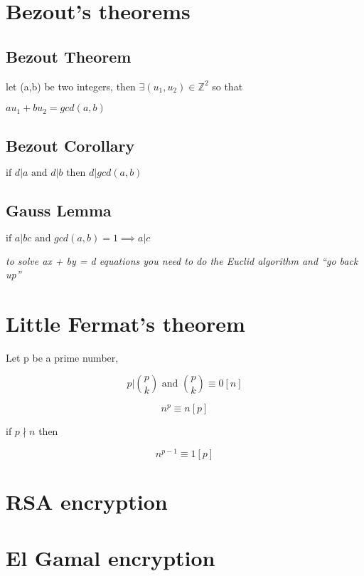 \documentclass[notitlepage]{math}
\begin{document}
\section{Bezout's theorems}

\subsection{Bezout Theorem} 

let (a,b) be two integers, then $\exists (u_1,u_2) \in \mathbb{Z}^2$  so that

$au_1 + b u_2 = gcd (a,b)$

\subsection{Bezout Corollary}

$\text {if }d|a \text { and } d|b \text { then } d|gcd(a,b)$

\subsection{Gauss Lemma}

$\text {if }a|bc \text { and } gcd(a,b) = 1 \implies a|c$

\textit{to solve ax + by = d equations you need to do the Euclid algorithm and “go back up”}


\section{Little Fermat's theorem}

Let p be a prime number, 

$$
p | {p \choose k} \text { and } {p \choose k} \equiv 0 [n]
$$

$$
n^p \equiv n[p]
$$

if $p \nmid n$ then

$$
n^{p-1} \equiv 1[p]
$$


\section{RSA encryption}

\section{El Gamal encryption}
\end{document}
